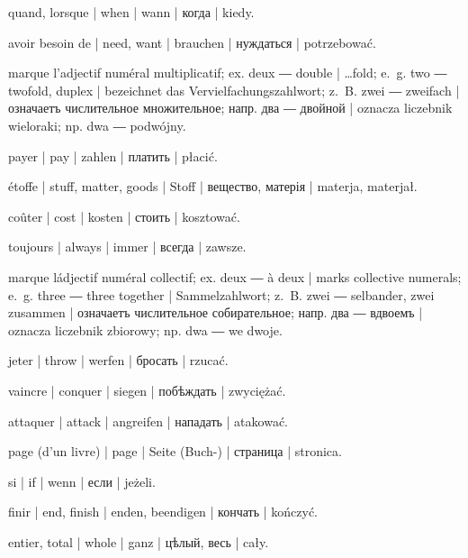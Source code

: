 \begin{ekzvocab}{1em}
 quand, lorsque | when | wann | когда | kiedy.

 avoir besoin de | need, want | brauchen | нуждаться | potrzebować.

 marque l’adjectif numéral multiplicatif; ex.  deux ―  double | \ldots{}fold; e.~g.  two ―  twofold, duplex | bezeichnet das Vervielfachungszahlwort; z.~B.  zwei ―  zweifach | означаетъ числительное множительное; напр.  два ―  двойной | oznacza liczebnik wieloraki; np.  dwa ―  podwójny.

 payer | pay | zahlen | платить | płacić.

 étoffe | stuff, matter, goods | Stoff | вещество, матерія | materja, materjał.

 coûter | cost | kosten | стоить | kosztować.

 toujours | always | immer | всегда | zawsze.

 marque ládjectif numéral collectif; ex.  deux ―  à deux | marks collective numerals; e.~g.  three ―  three together | Sammelzahlwort; z.~B.  zwei ―  selbander, zwei zusammen | означаетъ числительное собирательное; напр.  два ―  вдвоемъ | oznacza liczebnik zbiorowy; np.  dwa ―  we dwoje.

 jeter | throw | werfen | бросать | rzucać.

 vaincre | conquer | siegen | побѣждать | zwyciężać.

 attaquer | attack | angreifen | нападать | atakować.

 page (d’un livre) | page | Seite (Buch-) | страница | stronica.

 si | if | wenn | если | jeżeli.

 finir | end, finish | enden, beendigen | кончать | kończyć.

 entier, total | whole | ganz | цѣлый, весь | cały.

\end{ekzvocab}



